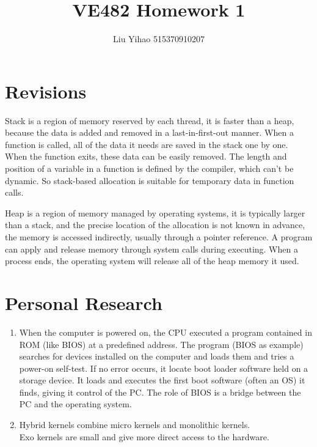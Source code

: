 \documentclass{article}
\title{VE482 Homework 1}
\author{Liu Yihao 515370910207}
\date{}
\begin{document}
\maketitle

\section{Revisions}
Stack is a region of memory reserved by each thread, it is faster than a heap, because the data is added and removed in a last-in-first-out manner. When a function is called, all of the data it needs are saved in the stack one by one. When the function exits, these data can be easily removed. The length and position of a variable in a function is defined by the compiler, which can't be dynamic. So stack-based allocation is suitable for temporary data in function calls.

Heap is a region of memory managed by  operating systems, it is typically larger than a stack, and the precise location of the allocation is not known in advance, the memory is accessed indirectly, usually through a pointer reference. A program can apply and release memory through system calls during executing. When a process ends, the operating system will release all of the heap memory it used.

\section{Personal Research}
\begin{enumerate}
\item
When the computer is powered on, the CPU executed a program contained in ROM (like BIOS) at a predefined address. The program (BIOS as example) searches for devices installed on the computer and loads them and tries a power-on self-test. If no error occurs, it locate boot loader software held on a storage device. It loads and executes the first boot software (often an OS) it finds, giving it control of the PC. The role of BIOS is a bridge between the PC and the operating system.
\item
Hybrid kernels combine micro kernels and monolithic kernels. \\
Exo kernels are small and give more direct access to the hardware.
\end{enumerate}
\end{document}
